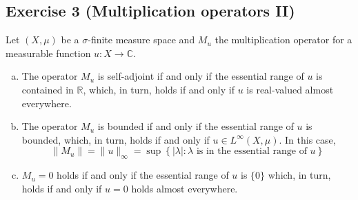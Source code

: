 \subsection{Exercise 3 (Multiplication operators II)}

Let $(X,\mu)$ be a $\sigma$-finite measure space and $M_{u}$ the multiplication operator for a measurable function $u:X\to\mathbb{C}$.
\begin{enumerate}[(a)]
	\item
		The operator $M_{u}$ is self-adjoint if and only if the essential range of $u$ is contained in $\mathbb{R}$, which, in turn, holds if and only if $u$ is real-valued almost everywhere.
	\item
		The operator $M_{u}$ is bounded if and only if the essential range of $u$ is bounded, which, in turn, holds if and only if $u\in L^{\infty}(X,\mu)$. In this case,
		\begin{equation*}
			\|M_{u}\| = \|u\|_{\infty} = \sup\left\{|\lambda|\colon \lambda \text{ is in the essential range of }u\right\}
		\end{equation*}
	\item
		$M_{u}=0$ holds if and only if the essential range of $u$ is $\{0\}$ which, in turn, holds if and only if $u=0$ holds almost everywhere.
\end{enumerate}

